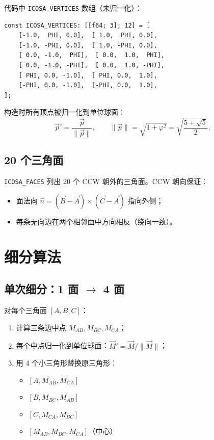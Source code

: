\documentclass[11pt,a4paper]{article}
\begin{document}
代码中 \texttt{ICOSA\_VERTICES} 数组（未归一化）：
\begin{lstlisting}
const ICOSA_VERTICES: [[f64; 3]; 12] = [
    [-1.0,  PHI, 0.0],  [ 1.0,  PHI, 0.0],
    [-1.0, -PHI, 0.0],  [ 1.0, -PHI, 0.0],
    [ 0.0, -1.0,  PHI],  [ 0.0,  1.0,  PHI],
    [ 0.0, -1.0, -PHI],  [ 0.0,  1.0, -PHI],
    [ PHI, 0.0, -1.0],  [ PHI, 0.0,  1.0],
    [-PHI, 0.0, -1.0],  [-PHI, 0.0,  1.0],
];
\end{lstlisting}

构造时所有顶点被归一化到单位球面：
\[
  \vec{p}' = \frac{\vec{p}}{\|\vec{p}\|}, \qquad
  \|\vec{p}\| = \sqrt{1 + \varphi^2} = \sqrt{\frac{5 + \sqrt{5}}{2}}.
\]

\subsection{20 个三角面}

\texttt{ICOSA\_FACES} 列出 20 个 CCW 朝外的三角面。CCW 朝向保证：
\begin{itemize}
  \item 面法向 $\hat{n} = (\vec{B}-\vec{A}) \times (\vec{C}-\vec{A})$ 指向外侧；
  \item 每条无向边在两个相邻面中方向相反（绕向一致）。
\end{itemize}

\section{细分算法}

\subsection{单次细分：1 面 $\to$ 4 面}

对每个三角面 $[A, B, C]$：
\begin{enumerate}
  \item 计算三条边中点 $M_{AB}, M_{BC}, M_{CA}$；
  \item 每个中点归一化到单位球面：$\vec{M}' = \vec{M} / \|\vec{M}\|$；
  \item 用 4 个小三角形替换原三角形：
    \begin{itemize}
      \item $[A, M_{AB}, M_{CA}]$
      \item $[B, M_{BC}, M_{AB}]$
      \item $[C, M_{CA}, M_{BC}]$
      \item $[M_{AB}, M_{BC}, M_{CA}]$（中心）
    \end{itemize}
\end{enumerate}
\end{document}

